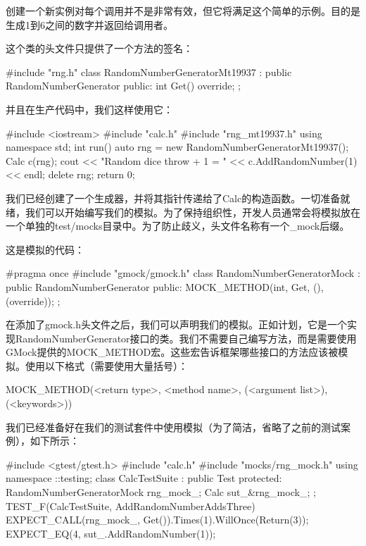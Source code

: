 创建一个新实例对每个调用并不是非常有效，但它将满足这个简单的示例。目的是生成1到6之间的数字并返回给调用者。

这个类的头文件只提供了一个方法的签名：


\begin{cpp}
#include "rng.h"
class RandomNumberGeneratorMt19937
    : public RandomNumberGenerator {
public:
    int Get() override;
};
\end{cpp}

并且在生产代码中，我们这样使用它：


\begin{cpp}
#include <iostream>
#include "calc.h"
#include "rng_mt19937.h"
using namespace std;
int run() {
    auto rng = new RandomNumberGeneratorMt19937();
    Calc c(rng);
    cout << "Random dice throw + 1 = "
         << c.AddRandomNumber(1) << endl;
    delete rng;
    return 0;
}
\end{cpp}

我们已经创建了一个生成器，并将其指针传递给了Calc的构造函数。一切准备就绪，我们可以开始编写我们的模拟。为了保持组织性，开发人员通常会将模拟放在一个单独的test/mocks目录中。为了防止歧义，头文件名称有一个\_mock后缀。

这是模拟的代码：


\begin{cpp}
#pragma once
#include "gmock/gmock.h"
class RandomNumberGeneratorMock : public
RandomNumberGenerator {
public:
    MOCK_METHOD(int, Get, (), (override));
};
\end{cpp}

在添加了gmock.h头文件之后，我们可以声明我们的模拟。正如计划，它是一个实现RandomNumberGenerator接口的类。我们不需要自己编写方法，而是需要使用GMock提供的MOCK\_METHOD宏。这些宏告诉框架哪些接口的方法应该被模拟。使用以下格式（需要使用大量括号）：

\begin{shell}
MOCK_METHOD(<return type>, <method name>,
           (<argument list>), (<keywords>))
\end{shell}

我们已经准备好在我们的测试套件中使用模拟（为了简洁，省略了之前的测试案例），如下所示：


\begin{cpp}
#include <gtest/gtest.h>
#include "calc.h"
#include "mocks/rng_mock.h"
using namespace ::testing;
class CalcTestSuite : public Test {
protected:
    RandomNumberGeneratorMock rng_mock_;
    Calc sut_{&rng_mock_};
};
TEST_F(CalcTestSuite, AddRandomNumberAddsThree) {
    EXPECT_CALL(rng_mock_, Get()).Times(1).WillOnce(Return(3));
    EXPECT_EQ(4, sut_.AddRandomNumber(1));
}
\end{cpp}

